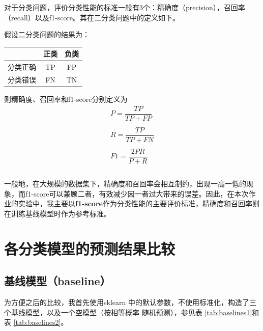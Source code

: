 \documentclass[12pt,a4paper]{article}
\theoremstyle{definition}
\begin{document}
对于分类问题，评价分类性能的标准一般有3个：精确度（precision），召回率（recall）以及f1-score。其在二分类问题中的定义如下。

假设二分类问题的结果为：


\begin{table}[H]
	\centering
	\begin{tabular}{c|c|c}
		& 正类 &  负类 \\
		\hline
		\hline
	
		 分类正确 & TP & FP \\
		 分类错误 & FN & TN \\
	\end{tabular}
\end{table}

则精确度、召回率和f1-score分别定义为
\begin{equation}
	\begin{aligned}
	P = \dfrac{TP}{TP + FP} \\ \\
	R = \dfrac{TP}{TP + FN} \\ \\
	F1 = \dfrac{2PR}{P + R} \\ \\
	\end{aligned}
\end{equation}

\vspace{-0.03\linewidth}
一般地，在大规模的数据集下，精确度和召回率会相互制约，出现一高一低的现象，而f1-score可以兼顾二者，有效减少因一者过大带来的误差。因此，在本次作业的实验中，我主要以\textbf{f1-score}作为分类性能的主要评价标准，精确度和召回率则在训练基线模型时作为参考标准。

\section{各分类模型的预测结果比较}
\label{sec:model-single}

\subsection{基线模型（baseline）}

为方便之后的比较，我首先使用sklearn \cite{sklearn}中的默认参数，不使用标准化，构造了三个基线模型，以及一个空模型（按相等概率 随机预测），参见表 \ref{tab:baselines1}和表 \ref{tab:baselines2}。
\end{document}
